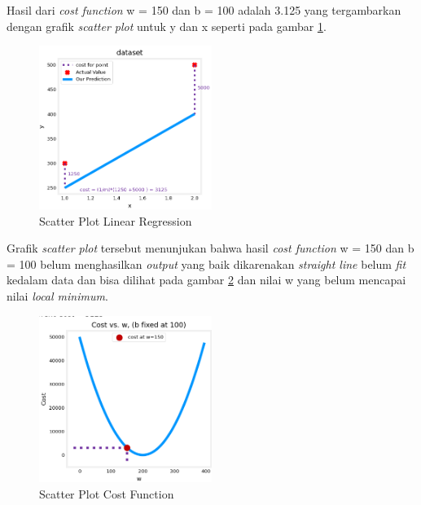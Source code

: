 Hasil dari \textit{cost function} w = 150 dan b = 100 adalah 3.125 yang tergambarkan dengan grafik \textit{scatter plot} untuk y dan x seperti pada gambar \ref{fig:2.scatterplotlinear}.
\begin{figure}[H] %
    \centering
    \includegraphics[width=0.5\textwidth]{figure/scatter plot linear regression.png}
    \caption{Scatter Plot Linear Regression}
    \label{fig:2.scatterplotlinear}
\end{figure}
Grafik \textit{scatter plot} tersebut menunjukan bahwa hasil \textit{cost function} w = 150 dan b = 100 belum menghasilkan \textit{output} yang baik dikarenakan \textit{straight line} belum \textit{fit} kedalam data dan bisa dilihat pada gambar \ref{fig:2.scatterplotcost} dan nilai w yang belum mencapai nilai \textit{local minimum}.
\begin{figure}[H] %
    \centering
    \includegraphics[width=0.5\textwidth]{figure/Scatter plot cost function.png}
    \caption{Scatter Plot Cost Function}
    \label{fig:2.scatterplotcost}
\end{figure}


